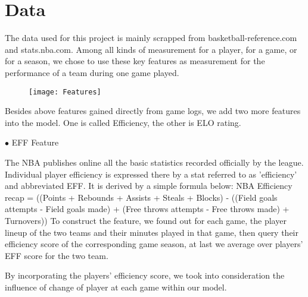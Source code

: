 \section{Data}

The data used for this project is mainly scrapped from basketball-reference.com
and stats.nba.com. Among all kinds of measurement for a player, for a game, or
for a season, we chose to use these key features as measurement for the performance
of a team during one game played.

\begin{figure}[h]
\centering
\texttt{[image: Features]}
\end{figure}

Besides above features gained directly from game logs, we add two more features
into the model. One is called Efficiency, the other is ELO rating.


$\bullet$ EFF Feature

The NBA publishes online all the basic statistics recorded officially by the 
league. Individual player efficiency is expressed there by a stat referred to
as 'efficiency' and abbreviated EFF. It is derived by a simple formula below:
NBA Efficiency recap = ((Points + Rebounds + Assists + Steals + Blocks) - ((Field goals attempts - Field goals made) + (Free throws attempts - Free throws made) + Turnovers))
To construct the feature, we found out for each game, the player lineup of the
two teams and their minutes played in that game, then query their efficiency
score of the corresponding game season, at last we average over players’ EFF
score for the two team. 

By incorporating the players’ efficiency score, we took into consideration the
influence of change of player at each game within our model. 




